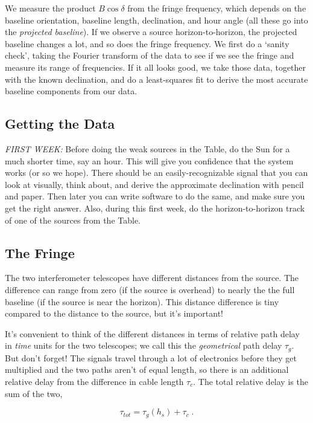 \documentclass[11pt,preprint]{aastex}
\begin{document}
We measure the product $B \cos \delta$ from the fringe frequency, which
depends on the baseline orientation, baseline length, declination, and
hour angle (all these go into the {\it projected baseline}). If we
observe a source horizon-to-horizon, the projected baseline changes a
lot, and so does the fringe frequency. We first do a `sanity check',
taking the Fourier transform of the data to see if we see the fringe and
measure its range of frequencies. If it all looks good, we take those
data, together with the known declination, and do a least-squares fit to
derive the most accurate baseline components
from our data.

\subsection{Getting the Data}

	{\it FIRST WEEK:} Before doing the weak sources in the Table, do
the Sun for a much shorter time, say an hour. This will give you
confidence that the system works (or so we hope). There should be an
easily-recognizable signal that you can look at visually, think about,
and derive the approximate declination with pencil and paper. Then later
you can write software to do the same, and make sure you get the right
answer.  Also, during this first week, do the horizon-to-horizon track
of one of the sources from the Table.

\subsection{The Fringe} \label{details}

	The two interferometer telescopes have different distances from
the source. The difference can range from zero (if the source is
overhead) to nearly the the full baseline (if the source is near the
horizon). This distance difference is tiny compared to the distance to
the source, but it's important! 

	It's convenient to think of the different distances in terms of 
relative path delay in {\it time} units for the two telescopes; we call
this the {\it geometrical} path delay $\tau_g$.  But don't forget! The
signals travel through a lot of electronics before they get multiplied
and the two paths aren't of equal length, so there is an additional
relative delay from the difference in cable length $\tau_c$.  The total
relative delay is the sum of the two,

\begin{equation}
 \tau_{tot} = \tau_g(h_s) + \tau_c \; . 
\end{equation}
\end{document}
